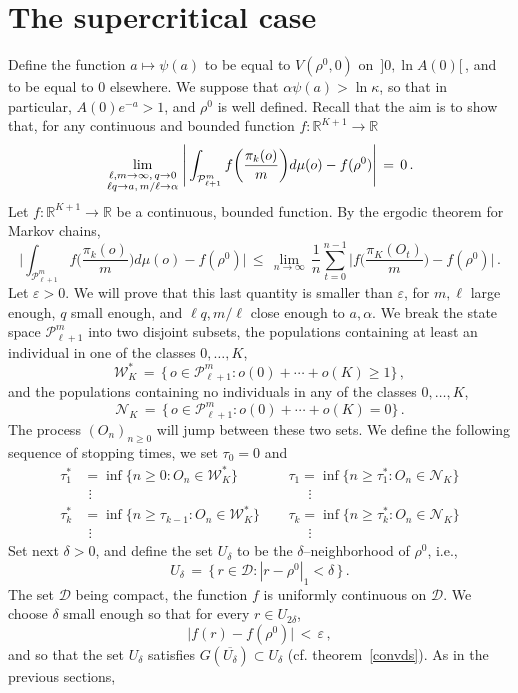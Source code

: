 \documentclass[a4paper,12pt]{article}
\theoremstyle{definition}
\theoremstyle{remark}
\def \cD {\mathcal{D}}
\def \cN {\mathcal{N}}
\def \cP {\mathcal{P}}
\def \cW {\mathcal{W}}
\def \a {\alpha}
\def \d {\delta}
\def \e {\varepsilon}
\def \k {\kappa}
\def \R {\mathbb{R}}
\def \lra {\longrightarrow}
\def \Ot {(O_n)_{n\geq 0}}
\def \pml {\cP^m_{\ell +1}}
\def \cW {{\mathcal W}^*}
\def \exa {e^{-a}}
\def\lmq {{\genfrac{}{}{0pt}{1}{\ell,m\to\infty,\,q\to0}{\ell q\to a,\,m/\ell\to\a}}}
\begin{document}
\section{The supercritical case}\label{super}
Define the function $a\mapsto\psi(a)$
to be equal to $V(\rho^0,0)$ on $\,]0,\ln A(0)[\,$, and 
to be equal to $0$ elsewhere.
We suppose that $\a\psi(a)>\ln\k$,
so that in particular, $A(0)\exa>1$, and $\rho^0$ is well defined.
Recall that the aim is to show that, for any 
continuous and bounded function $f:\R^{K+1}\lra\R$
$$\lim_\lmq\Bigg|\int_{\pml}f\bigg(
\frac{\pi_k(o)}{m}
\bigg)d\mu(o)-f(\rho^0)\Bigg|
\,=\,0\,.$$
Let $f:\R^{K+1}\lra\R$ be a continuous, bounded function.
By the ergodic theorem for Markov chains,
$$
\Bigg|\int_{\pml}f\bigg(
\frac{\pi_k(o)}{m}
\bigg)d\mu(o)-f(\rho^0)\Bigg|
\,\leq\,
\lim_{n\to\infty}\,
\frac{1}{n}\sum_{t=0}^{n-1}
\Bigg|
f\bigg(
\frac{\pi_K(O_t)}{m}
\bigg)-f(\rho^0)
\Bigg|\,.
$$
Let $\e>0$. We will prove that this last quantity
is smaller than $\e$, for $m,\ell$ large enough, $q$ small enough,
and $\ell q, m/\ell$ close enough to $a,\a$. 
We break the state space $\pml$
into two disjoint subsets,
the populations containing at least an individual
in one of the classes ${0,\dots,K}$,
$$\cW_K\,=\,
\Big\lbrace\,
o\in\pml:
o(0)+\cdots+o(K)\geq 1
\Big\rbrace\,,$$
and the populations containing no individuals
in any of the classes ${0,\dots,K}$,
$$\cN_K\,=\,
\Big\lbrace\,
o\in\pml:
o(0)+\cdots+o(K)=0
\Big\rbrace\,.$$
The process $\Ot$ will jump between these two sets.
We define the following sequence of stopping times, 
we set $\tau_0=0$ and 
\begin{align*}
\tau^*_1&=\inf\big\lbrace
n\geq0:
O_n\in\cW_K
\big\rbrace\qquad
&&\tau_1=\inf\big\lbrace
n\geq \tau^*_1:
O_n\in \cN_K
\big\rbrace\\
&\ \, \vdots &&\ \ \quad\vdots\\
\tau^*_k&=\inf\big\lbrace
n\geq \tau_{k-1}:
O_n\in \cW_K
\big\rbrace\ 
&&\tau_k=\inf\big\lbrace
n\geq \tau^*_k:
O_n\in\cN_K
\big\rbrace\\
&\ \, \vdots &&\ \ \quad\vdots
\end{align*}
Set next $\d>0$, and define the set $U_\d$ to
be the $\d$--neighborhood of $\rho^0$, i.e.,
$$U_\d\,=\,\big\lbrace\,
r\in\cD:|r-\rho^0|_1<\d
\,\big\rbrace\,.$$
The set $\cD$ being compact, the function $f$ is uniformly continuous on $\cD$.
We choose $\d$ small enough so that for every $r\in U_{2\d}$,
$$\big|f(r)-f(\rho^0)\big|\,<\,\e\,,$$
and so that the set $U_\d$ satisfies $G(\overline{U_\d})\subset U_\d$
(cf. theorem~\ref{convds}).
As in the previous sections,
\end{document}

